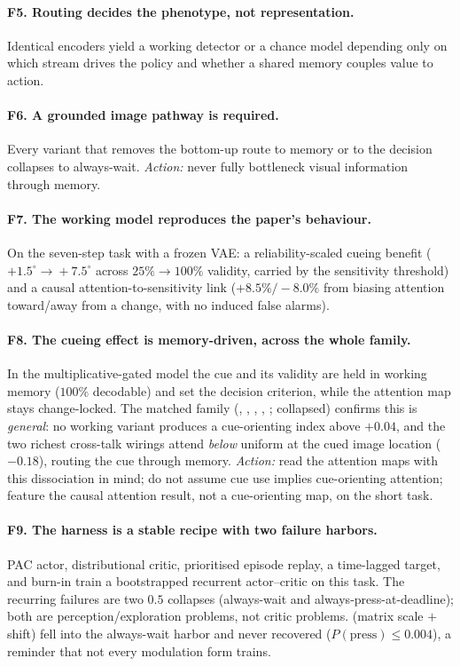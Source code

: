\paragraph{F5. Routing decides the phenotype, not representation.} Identical encoders yield a
working detector or a chance model depending only on which stream drives the policy and
whether a shared memory couples value to action.

\paragraph{F6. A grounded image pathway is required.} Every variant that removes the
bottom-up route to memory or to the decision collapses to always-wait. \emph{Action:} never
fully bottleneck visual information through memory.

\paragraph{F7. The working model reproduces the paper's behaviour.} On the seven-step task
with a frozen VAE: a reliability-scaled cueing benefit ($+1.5^\circ\!\to\!+7.5^\circ$ across
$25\%\!\to\!100\%$ validity, carried by the sensitivity threshold) and a causal
attention-to-sensitivity link ($+8.5\%/-8.0\%$ from biasing attention toward/away from a
change, with no induced false alarms).

\paragraph{F8. The cueing effect is memory-driven, across the whole family.} In the
multiplicative-gated model the cue and its validity are held in working memory ($100\%$
decodable) and set the decision criterion, while the attention map stays change-locked. The
matched family (, , , ,
;  collapsed) confirms this is \emph{general}: no working variant
produces a cue-orienting index above $+0.04$, and the two richest cross-talk wirings attend
\emph{below} uniform at the cued image location ($-0.18$), routing the cue through memory.
\emph{Action:} read the attention maps with this dissociation in mind; do not assume cue use
implies cue-orienting attention; feature the causal attention result, not a cue-orienting
map, on the short task.

\paragraph{F9. The harness is a stable recipe with two failure harbors.} PAC actor,
distributional critic, prioritised episode replay, a time-lagged target, and burn-in train a
bootstrapped recurrent actor--critic on this task. The recurring failures are two $0.5$
collapses (always-wait and always-press-at-deadline); both are perception/exploration
problems, not critic problems.  (matrix scale $+$ shift) fell into the
always-wait harbor and never recovered ($P(\text{press})\le0.004$), a reminder that not
every modulation form trains.

